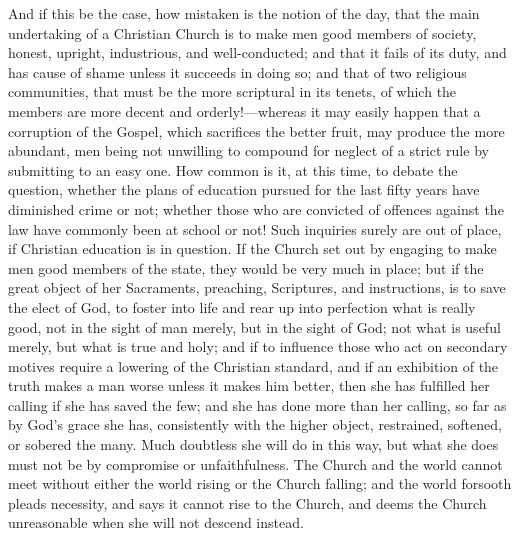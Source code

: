 And if this be the case, how mistaken is the notion of the day,
that the main undertaking of a Christian Church is to make men good
members of society, honest, upright, industrious, and well-conducted;
and that it fails of its duty, and has cause of shame unless it
succeeds in doing so; and that of two religious communities, that must
be the more scriptural in its tenets, of which the members are more
decent and orderly!—whereas it may easily happen that a corruption
of the Gospel, which sacrifices the better fruit, may produce the more
abundant, men being not unwilling to compound for neglect of a strict
rule by submitting to an easy one. How common is it, at this time, to
debate the question, whether the plans of education pursued for the
last fifty years have diminished crime or not; whether those who are
convicted of offences against the law have commonly been at school or
not! Such inquiries surely are out of place, if Christian education is
in question. If the Church set out by engaging to make men good
members of the state, they would be very much in place; but if the
great object of her Sacraments, preaching, Scriptures, and
instructions, is to save the elect of God, to foster into life and
rear up into perfection what is really good, not in the sight of man
merely, but in the sight of God; not what is useful merely, but what
is true and holy; and if to influence those who act on secondary
motives require a lowering of the Christian standard, and if an
exhibition of the truth makes a man worse unless it makes him better,
then she has fulfilled her calling if she has saved the few; and she
has done more than her calling, so far as by God's grace she has,
consistently with the higher object, restrained, softened, or sobered
the many. Much doubtless she will do in this way, but what she does
must not be by compromise or unfaithfulness. The Church and the world
cannot meet without either the world rising or the Church falling; and
the world forsooth pleads necessity, and says it cannot rise to the
Church, and deems the Church unreasonable when she will not descend
instead.

